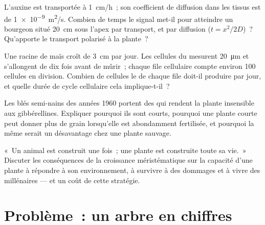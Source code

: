 \begin{exercise}[$\star\star$]\label{exo:b2:plant-meristems:9}
L'auxine est transportée à \qty{1}{cm/h}~; son coefficient de diffusion
dans les tissus est de \qty{1e-9}{m^2/s}. Combien de temps le signal
met-il pour atteindre un bourgeon situé \qty{20}{cm} sous l'apex par
transport, et par diffusion ($t = x^2/2D$)~? Qu'apporte le transport
polarisé à la plante~?
\end{exercise}

\begin{exercise}[$\star\star\star$]\label{exo:b2:plant-meristems:10}
Une racine de maïs croît de \qty{3}{cm} par jour. Les cellules du
 mesurent \qty{20}{\micro m} et s'allongent de dix fois avant
de mûrir~; chaque file cellulaire compte environ \num{100} cellules en
division. Combien de cellules le  de chaque file doit-il
produire par jour, et quelle durée de cycle cellulaire cela
implique-t-il~?
\end{exercise}

\begin{exercise}[$\star\star\star$]\label{exo:b2:plant-meristems:11}
Les blés semi-nains des années 1960 portent des  qui rendent la
plante insensible aux gibbérellines. Expliquer pourquoi ils sont courts,
pourquoi une plante courte peut donner plus de grain lorsqu'elle est
abondamment fertilisée, et pourquoi la même  serait un
désavantage chez une plante sauvage.
\end{exercise}

\begin{exercise}[$\star\star\star$]\label{exo:b2:plant-meristems:12}
«~Un animal est construit une fois~; une plante est construite toute sa
vie.~» Discuter les conséquences de la croissance méristématique sur la
capacité d'une plante à répondre à son environnement, à survivre à des
dommages et à vivre des millénaires --- et un coût de cette stratégie.
\end{exercise}

\section{Problème~: un arbre en chiffres}

